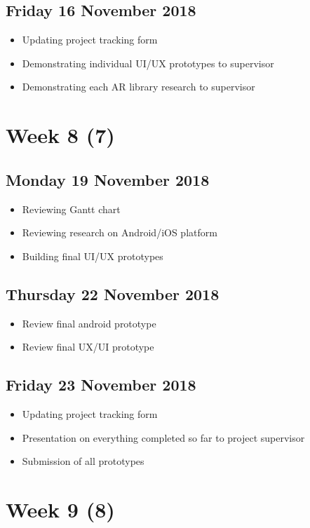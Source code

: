 \subsection*{Friday 16 November 2018}
\begin{itemize}
    \item Updating project tracking form
	\item Demonstrating individual UI/UX prototypes to supervisor
	\item Demonstrating each AR library research to supervisor
\end{itemize}

\section*{Week 8 (7)}
\subsection*{Monday 19 November 2018}
\begin{itemize}
	\item Reviewing Gantt chart
	\item Reviewing research on Android/iOS platform
	\item Building final UI/UX prototypes
\end{itemize}

\subsection*{Thursday 22 November 2018}
\begin{itemize}
	\item Review final android prototype
	\item Review final UX/UI prototype
\end{itemize}

\subsection*{Friday 23 November 2018}
\begin{itemize}
    \item Updating project tracking form
	\item Presentation on everything completed so far to project supervisor
	\item Submission of all prototypes
\end{itemize}

\section*{Week 9 (8)}
